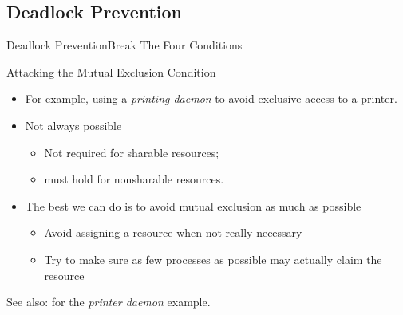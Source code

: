 \subsection{Deadlock Prevention}
\label{sec:deadlock-prevention}

\begin{frame}{Deadlock Prevention}{Break The Four Conditions}
  \begin{block}{Attacking the Mutual Exclusion Condition}
    \begin{itemize}
    \item For example, using a \emph{printing daemon} to avoid exclusive access to a printer.
    \item Not always possible
      \begin{itemize}
      \item Not required for sharable resources;
      \item must hold for nonsharable resources.
      \end{itemize}
    \item The best we can do is to avoid mutual exclusion as much as possible
      \begin{itemize}
      \item Avoid assigning a resource when not really necessary
      \item Try to make sure as few processes as possible may actually claim the resource
      \end{itemize}
    \end{itemize}
  \end{block}
\end{frame}

See also:  for the \emph{printer daemon} example.

